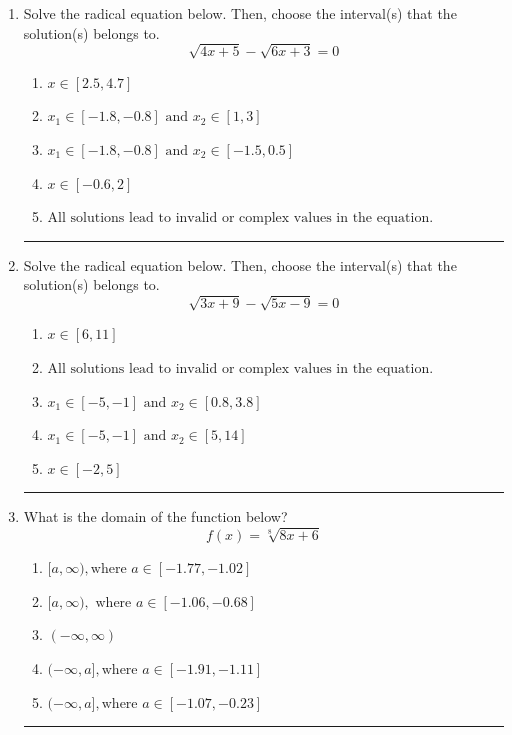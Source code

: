 \documentclass[14pt]{extbook}
\newcommand{\litem}[1]{\item#1\hspace*{-1cm}\rule{\textwidth}{0.4pt}}
\begin{document}
\begin{enumerate}
{\begin{enumerate}[label=\Alph*.]
\end{enumerate} }
\litem{
Solve the radical equation below. Then, choose the interval(s) that the solution(s) belongs to.\[ \sqrt{4 x + 5} - \sqrt{6 x + 3} = 0 \]\begin{enumerate}[label=\Alph*.]
\item \( x \in [2.5,4.7] \)
\item \( x_1 \in [-1.8, -0.8] \text{ and } x_2 \in [1,3] \)
\item \( x_1 \in [-1.8, -0.8] \text{ and } x_2 \in [-1.5,0.5] \)
\item \( x \in [-0.6,2] \)
\item \( \text{All solutions lead to invalid or complex values in the equation.} \)

\end{enumerate} }
\litem{
Solve the radical equation below. Then, choose the interval(s) that the solution(s) belongs to.\[ \sqrt{3 x + 9} - \sqrt{5 x - 9} = 0 \]\begin{enumerate}[label=\Alph*.]
\item \( x \in [6,11] \)
\item \( \text{All solutions lead to invalid or complex values in the equation.} \)
\item \( x_1 \in [-5, -1] \text{ and } x_2 \in [0.8,3.8] \)
\item \( x_1 \in [-5, -1] \text{ and } x_2 \in [5,14] \)
\item \( x \in [-2,5] \)

\end{enumerate} }
\litem{
What is the domain of the function below?\[ f(x) = \sqrt[8]{8 x + 6} \]\begin{enumerate}[label=\Alph*.]
\item \( [a, \infty), \text{where } a \in [-1.77, -1.02] \)
\item \( [a, \infty), \text{ where } a \in [-1.06, -0.68] \)
\item \( (-\infty, \infty) \)
\item \( (-\infty, a], \text{where } a \in [-1.91, -1.11] \)
\item \( (-\infty, a], \text{where } a \in [-1.07, -0.23] \)


\end{enumerate}}
\end{enumerate}
\end{document}
